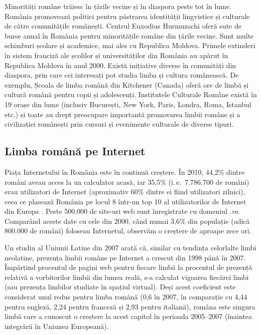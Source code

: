 \begin{multicols}{2}
Minorități române trăiesc în țările vecine și în diaspora peste tot în lume. România promovează politici pentru păstrarea identității lingvistice și culturale de către comunitățile românești. Centrul Euxodius Hurmuzachi oferă sute de burse anual în România pentru minoritățile române din țările vecine. Sunt multe schimburi școlare și academice, mai ales cu Republica Moldova. Primele extinderi în sistem franciză ale școlilor și universităților din România au apărut în Republica Moldova în anul 2000.
Există inițiative diverse în comunități din diaspora, prin care cei interesați pot studia limba și cultura românească. De exemplu, Școala de limba română din Kitchener (Canada) oferă ore de limbă și cultură română pentru copii și adolescenți.
Institutele Culturale Române există în 19 orașe din lume (inclusiv București, New York, Paris, Londra, Roma, Istanbul etc.) și toate au drept preocupare importantă promovarea limbii române și a civilizației românești prin cursuri și evenimente culturale de diverse tipuri.

\subsection{Limba română pe Internet}

Piața Internetului în România este în continuă creștere. În 2010, 44,2\% dintre români aveau acces la un calculator acasă, iar 35,5\% (i.\,e.~7.786.700 de români) erau utilizatori de Internet \cite{urlInternetStatsRO} (aproximativ 60\% dintre ei fiind utilizatori zilnici), ceea ce plasează România pe locul 8 \mbox{într-un} top 10 al utilizatorilor de Internet din Europa \cite{urlInternetStatsEU}. Peste 500.000 de \mbox{site-uri} web sunt înregistrate cu domeniul \textit{.ro}. Comparând aceste date cu cele din 2000, când numai 3,6\% din populație (adică 800.000 de români) foloseau Internetul, observăm o creștere de aproape zece ori.

Un studiu al Uniunii Latine din 2007 \cite{uniunealat} arată că, similar cu tendința celorlalte limbi neolatine, prezența limbii române pe Internet a crescut din 1998 până în 2007. Împărțind procentul de pagini web pentru fiecare limbă la procentul de prezență relativă a vorbitorilor limbii din lumea reală, s-a calculat vigoarea fiecărei limbi (sau prezența limbilor studiate în spațiul virtual). Deși acest coeficient este considerat unul redus pentru limba română (0,6 în 2007, în comparație cu 4,44 pentru engleză, 2,24 pentru franceză și 2,93 pentru italiană), româna este singura limbă care a cunoscut o creștere la acest capitol în perioada 2005--2007 (înaintea integrării în Uniunea Europeană).


\end{multicols}
